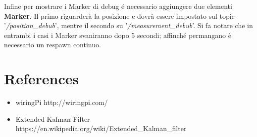 \documentclass{article}
\begin{document}
Infine per mostrare i Marker di debug \'e necessario aggiungere due elementi \textbf{Marker}.
Il primo riguarder\`a la posizione e dovr\`a essere impostato sul topic '\textit{/position\_debub}', mentre il secondo su '\textit{/measurement\_debub}'.
Si fa notare che in entrambi i casi i Marker svaniranno dopo 5 secondi; affinch\'e permangano \`e necessario un respawn continuo.






\section{References}
\begin{itemize}
	\item wiringPi http://wiringpi.com/
	\item Extended Kalman Filter https://en.wikipedia.org/wiki/Extended\_Kalman\_filter
\end{itemize}

\printindex
\end{document}

